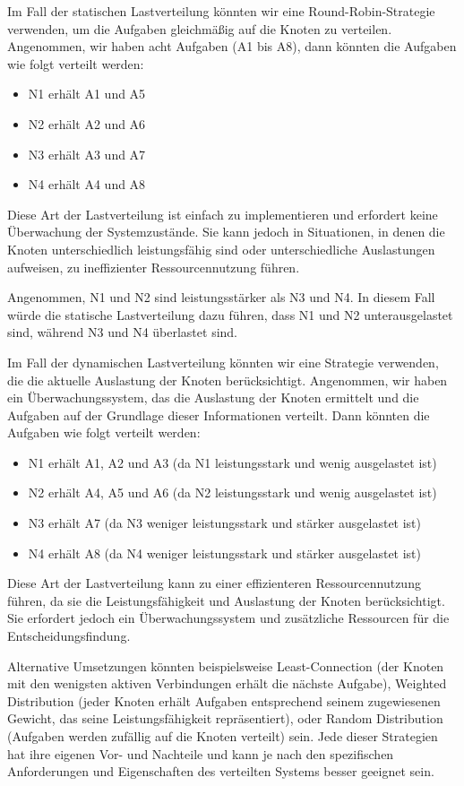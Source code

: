 \documentclass[../vs-script-first-v01.tex]{subfiles}
\begin{document}
Im Fall der statischen Lastverteilung könnten wir eine Round-Robin-Strategie verwenden, um die Aufgaben gleichmäßig auf die Knoten zu verteilen. Angenommen, wir haben acht Aufgaben (A1 bis A8), dann könnten die Aufgaben wie folgt verteilt werden:
\begin{itemize}
\item N1 erhält A1 und A5
\item N2 erhält A2 und A6
\item N3 erhält A3 und A7
\item N4 erhält A4 und A8
\end{itemize}
Diese Art der Lastverteilung ist einfach zu implementieren und erfordert keine Überwachung der Systemzustände. Sie kann jedoch in Situationen, in denen die Knoten unterschiedlich leistungsfähig sind oder unterschiedliche Auslastungen aufweisen, zu ineffizienter Ressourcennutzung führen.

Angenommen, N1 und N2 sind leistungsstärker als N3 und N4. In diesem Fall würde die statische Lastverteilung dazu führen, dass N1 und N2 unterausgelastet sind, während N3 und N4 überlastet sind.

Im Fall der dynamischen Lastverteilung könnten wir eine Strategie verwenden, die die aktuelle Auslastung der Knoten berücksichtigt. Angenommen, wir haben ein Überwachungssystem, das die Auslastung der Knoten ermittelt und die Aufgaben auf der Grundlage dieser Informationen verteilt. Dann könnten die Aufgaben wie folgt verteilt werden:
\begin{itemize}
\item N1 erhält A1, A2 und A3 (da N1 leistungsstark und wenig ausgelastet ist)
\item N2 erhält A4, A5 und A6 (da N2 leistungsstark und wenig ausgelastet ist)
\item N3 erhält A7 (da N3 weniger leistungsstark und stärker ausgelastet ist)
\item N4 erhält A8 (da N4 weniger leistungsstark und stärker ausgelastet ist)
\end{itemize}
Diese Art der Lastverteilung kann zu einer effizienteren Ressourcennutzung führen, da sie die Leistungsfähigkeit und Auslastung der Knoten berücksichtigt. Sie erfordert jedoch ein Überwachungssystem und zusätzliche Ressourcen für die Entscheidungsfindung.

Alternative Umsetzungen könnten beispielsweise Least-Connection (der Knoten mit den wenigsten aktiven Verbindungen erhält die nächste Aufgabe), Weighted Distribution (jeder Knoten erhält Aufgaben entsprechend seinem zugewiesenen Gewicht, das seine Leistungsfähigkeit repräsentiert), oder Random Distribution (Aufgaben werden zufällig auf die Knoten verteilt) sein. Jede dieser Strategien hat ihre eigenen Vor- und Nachteile und kann je nach den spezifischen Anforderungen und Eigenschaften des verteilten Systems besser geeignet sein.
\end{document}
